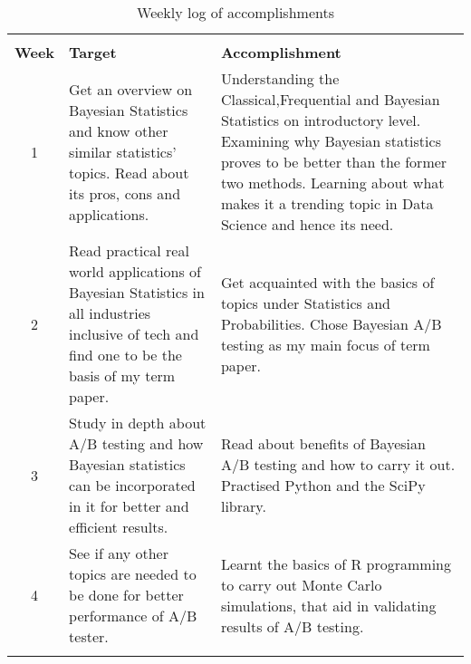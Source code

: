 \begin{center}
  \begin{longtable} {|c|p{5cm}|p{5cm}|}
    \hline\\
    \textbf{Week} & \textbf{Target} & \textbf{Accomplishment}\\
    \hline
    1& Get an overview on Bayesian Statistics and know other similar statistics' topics. Read about its pros, cons and applications.& Understanding the Classical,Frequential and Bayesian Statistics on introductory level. Examining why Bayesian statistics proves to be better than the former two methods. Learning about what makes it a trending topic in Data Science and hence its need.\\
    \hline
    2& Read practical real world applications of Bayesian Statistics in all industries inclusive of tech and find one to be the basis of my term paper.& Get acquainted with the basics of topics under Statistics and Probabilities. Chose Bayesian A/B testing as my main focus of term paper.\\
    \hline
    3& Study in depth about A/B testing and how Bayesian statistics can be incorporated in it for better and efficient results.& Read about benefits of Bayesian A/B testing and how to carry it out. Practised Python and the SciPy library.\\
    \hline
    4 & See if any other topics are needed to be done for better performance of A/B tester.& Learnt the basics of R programming to carry out Monte Carlo simulations, that aid in validating results of A/B testing.\\
    \hline
    \caption{Weekly log of accomplishments}
  \end{longtable}
  
  \label{tab:schedule}
\end{center}
